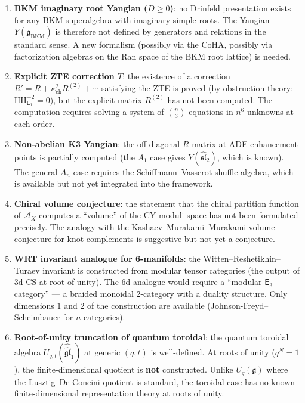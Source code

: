 \documentclass[11pt]{article}
\newcommand{\cA}{\mathcal{A}}
\newcommand{\fg}{\mathfrak{g}}
\newcommand{\fsl}{\mathfrak{sl}}
\newcommand{\fgl}{\mathfrak{gl}}
\newcommand{\Eone}{\mathsf{E}_1}
\newcommand{\HH}{\mathrm{HH}}
\begin{document}
\begin{enumerate}[label=\textup{(\arabic*)}]
 \item \textbf{BKM imaginary root Yangian ($D \geq 0$)}: no Drinfeld
 presentation exists for any BKM superalgebra with imaginary simple
 roots. The Yangian $Y(\fg_{\mathrm{BKM}})$ is therefore not defined
 by generators and relations in the standard sense. A new formalism
 (possibly via the CoHA, possibly via factorization algebras on the
 Ran space of the BKM root lattice) is needed.

 \item \textbf{Explicit ZTE correction $T$}: the existence of a
 correction $R' = R + \kappa_{\mathrm{ch}}^2 R^{(2)} + \cdots$ satisfying the
 ZTE is proved (by obstruction theory: $\HH^{-2}_{\Eone} = 0$),
 but the explicit matrix $R^{(2)}$ has not been computed. The
 computation requires solving a system of $\binom{n}{3}$ equations
 in $n^6$ unknowns at each order.

 \item \textbf{Non-abelian K3 Yangian}: the off-diagonal $R$-matrix
 at ADE enhancement points is partially computed (the $A_1$ case
 gives $Y(\widehat{\fsl}_2)$, which is known). The general $A_n$
 case requires the Schiffmann--Vasserot shuffle algebra, which is
 available but not yet integrated into the framework.

 \item \textbf{Chiral volume conjecture}: the statement that the
 chiral partition function of $\cA_X$ computes a ``volume'' of the
 CY moduli space has not been formulated precisely. The analogy with
 the Kashaev--Murakami--Murakami volume conjecture for knot
 complements is suggestive but not yet a conjecture.

 \item \textbf{WRT invariant analogue for 6-manifolds}: the
 Witten--Reshetikhin--Turaev invariant is constructed from modular
 tensor categories (the output of 3d CS at root of unity). The
 6d analogue would require a ``modular $\mathsf{E}_3$-category''
 --- a braided monoidal $2$-category with a duality structure.
 Only dimensions $1$ and $2$ of the construction are available
 (Johnson-Freyd--Scheimbauer for $n$-categories).

 \item \textbf{Root-of-unity truncation of quantum toroidal}: the
 quantum toroidal algebra $U_{q,t}(\widehat{\widehat{\fgl}}_1)$ at
 generic $(q, t)$ is well-defined. At roots of unity ($q^N = 1$),
 the finite-dimensional quotient is \textbf{not} constructed.
 Unlike $U_q(\fg)$ where the Lusztig--De Concini quotient is
 standard, the toroidal case has no known finite-dimensional
 representation theory at roots of unity.
\end{enumerate}
\end{document}
